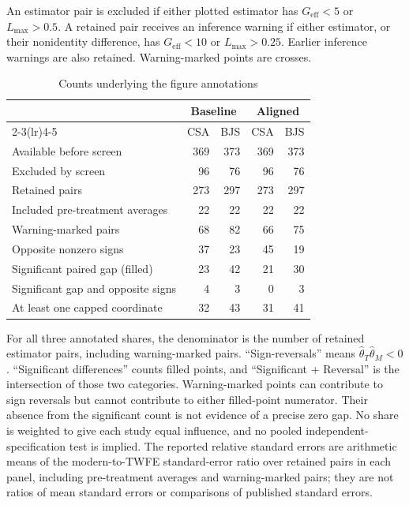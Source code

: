 \documentclass[11pt,letterpaper]{article}
\begin{document}
An estimator pair is excluded if either plotted estimator has $G_{\mathrm{eff}}<5$ or $L_{\max}>0.5$. A retained pair receives an inference warning if either estimator, or their nonidentity difference, has $G_{\mathrm{eff}}<10$ or $L_{\max}>0.25$. Earlier inference warnings are also retained. Warning-marked points are crosses.


\begin{table}[ht]
\centering
\caption{Counts underlying the figure annotations}
\small
\begin{tabular}{lrrrr}
\toprule
& \multicolumn{2}{c}{Baseline} & \multicolumn{2}{c}{Aligned}\\
\cmidrule(lr){2-3}\cmidrule(lr){4-5}
& CSA & BJS & CSA & BJS\\
\midrule
Available before screen & 369 & 373 & 369 & 373\\
Excluded by screen & 96 & 76 & 96 & 76\\
Retained pairs & 273 & 297 & 273 & 297\\
\quad Included pre-treatment averages & 22 & 22 & 22 & 22\\
Warning-marked pairs & 68 & 82 & 66 & 75\\
Opposite nonzero signs & 37 & 23 & 45 & 19\\
Significant paired gap (filled) & 23 & 42 & 21 & 30\\
Significant gap and opposite signs & 4 & 3 & 0 & 3\\
At least one capped coordinate & 32 & 43 & 31 & 41\\
\bottomrule
\end{tabular}
\end{table}

For all three annotated shares, the denominator is the number of retained estimator pairs, including warning-marked pairs. ``Sign-reversals'' means $\hat\theta_T\hat\theta_M<0$. ``Significant differences'' counts filled points, and ``Significant + Reversal'' is the intersection of those two categories. Warning-marked points can contribute to sign reversals but cannot contribute to either filled-point numerator. Their absence from the significant count is not evidence of a precise zero gap. No share is weighted to give each study equal influence, and no pooled independent-specification test is implied. The reported relative standard errors are arithmetic means of the modern-to-TWFE standard-error ratio over retained pairs in each panel, including pre-treatment averages and warning-marked pairs; they are not ratios of mean standard errors or comparisons of published standard errors.
\end{document}
